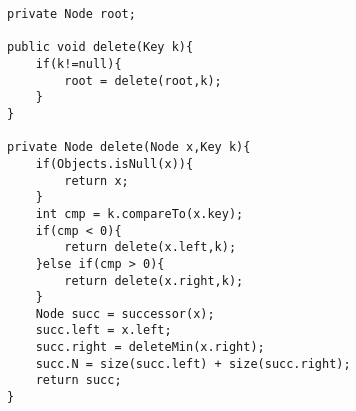 \documentclass[12pt,a4paper,draft]{article}
\begin{document}
\begin{lstlisting}[caption={Delete Operation}]
private Node root;

public void delete(Key k){
	if(k!=null){
		root = delete(root,k);
	}
}

private Node delete(Node x,Key k){
	if(Objects.isNull(x)){
		return x;
	}
	int cmp = k.compareTo(x.key);
	if(cmp < 0){
		return delete(x.left,k);
	}else if(cmp > 0){
		return delete(x.right,k);
	}
	Node succ = successor(x);
	succ.left = x.left;
	succ.right = deleteMin(x.right);
	succ.N = size(succ.left) + size(succ.right);
	return succ;
}
\end{lstlisting}
\end{document}
